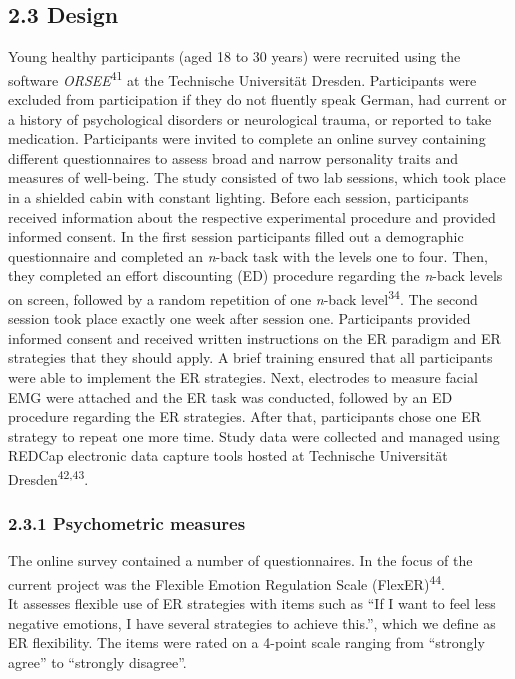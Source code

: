 \documentclass[
  man,floatsintext]{apa6}
\begin{document}
\hypertarget{design}{%
\subsection{2.3 Design}\label{design}}

Young healthy participants (aged 18 to 30 years) were recruited using the software \emph{ORSEE}\textsuperscript{41} at the Technische Universität Dresden.
Participants were excluded from participation if they do not fluently speak German, had current or a history of psychological disorders or neurological trauma, or reported to take medication.
Participants were invited to complete an online survey containing different questionnaires to assess broad and narrow personality traits and measures of well-being.
The study consisted of two lab sessions, which took place in a shielded cabin with constant lighting.
Before each session, participants received information about the respective experimental procedure and provided informed consent.
In the first session participants filled out a demographic questionnaire and completed an \emph{n}-back task with the levels one to four.
Then, they completed an effort discounting (ED) procedure regarding the \emph{n}-back levels on screen, followed by a random repetition of one \emph{n}-back level\textsuperscript{34}.
The second session took place exactly one week after session one.
Participants provided informed consent and received written instructions on the ER paradigm and ER strategies that they should apply.
A brief training ensured that all participants were able to implement the ER strategies.
Next, electrodes to measure facial EMG were attached and the ER task was conducted, followed by an ED procedure regarding the ER strategies.
After that, participants chose one ER strategy to repeat one more time.
Study data were collected and managed using REDCap electronic data capture tools hosted at Technische Universität Dresden\textsuperscript{42,43}.

\hypertarget{psychometric-measures}{%
\subsubsection{2.3.1 Psychometric measures}\label{psychometric-measures}}

The online survey contained a number of questionnaires.
In the focus of the current project was the Flexible Emotion Regulation Scale (FlexER)\textsuperscript{44}.\\
It assesses flexible use of ER strategies with items such as ``If I want to feel less negative emotions, I have several strategies to achieve this.'', which we define as ER flexibility.
The items were rated on a 4-point scale ranging from ``strongly agree'' to ``strongly disagree''.
\end{document}
